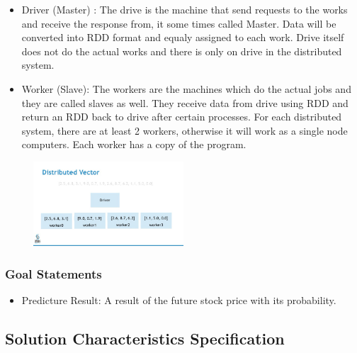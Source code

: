 \documentclass[12pt]{article}
\newcounter{goalnum} %
\begin{document}
\begin{itemize}

\item Driver (Master) : 
The drive is the machine that send requests to the works and receive the response from, it some times called Master. Data will be converted into RDD format and equaly assigned to each work. Drive itself does not do the actual works and there is only on drive in the distributed system.

\item Worker (Slave): 
The workers are the machines which do the actual jobs and they are called slaves as well. They receive data from drive using RDD and return an RDD back to drive after certain processes.  For each distributed system, there are at least 2 workers, otherwise it will work as a single node computers. Each worker has a copy of the program.  


\end{itemize}


\begin{figure}[h!]
\begin{center}
{
  \includegraphics[width=0.5\textwidth]{sparkrdd.png}
 }
 \caption{\label{Spark}}
 \end{center}
 \end{figure}

\subsubsection{Goal Statements}

\begin{itemize}

\item Predicture
  Result\thegoalnum \label{G_meaningfulLabel}: A result
  of the future stock price with its probability. 

\end{itemize}

\subsection{Solution Characteristics Specification}
\end{document}
